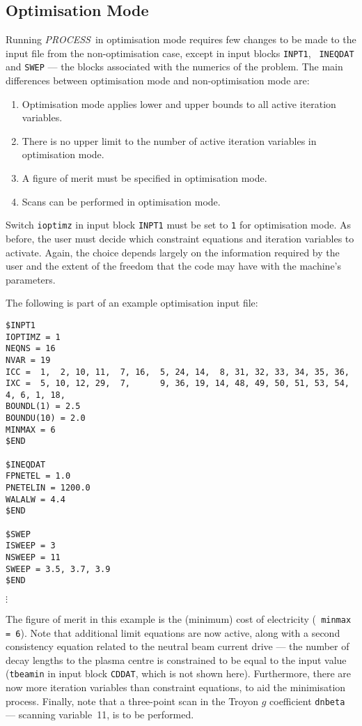 \documentclass[11pt,a4paper]{report}
\newcommand{\PS}{\mbox{\it PROCESS\/ }}
\begin{document}
\subsection{Optimisation Mode}
\label{sec:optim}
Running \PS in optimisation mode requires few changes to be made to the input
file from the non-optimisation case, except in input blocks {\tt INPT1}, {\tt
INEQDAT} and {\tt SWEP} --- the blocks associated with the numerics of the
problem. The main differences between optimisation mode and non-optimisation
mode are:
\begin{enumerate}
\item
Optimisation mode applies lower and upper bounds to all active iteration
variables.
\item
There is no upper limit to the number of active iteration variables in
optimisation mode.
\item
A figure of merit must be specified in optimisation mode.
\item
Scans can be performed in optimisation mode.
\end{enumerate}

Switch {\tt ioptimz} in input block {\tt INPT1} must be set to {\tt 1} for
optimisation mode. As before, the user must decide which constraint equations
and iteration variables to activate. Again, the choice depends largely on the
information required by the user and the extent of the freedom that the code
may have with the machine's parameters.

The following is part of an example optimisation input file:
\begin{verbatim}
$INPT1
IOPTIMZ = 1
NEQNS = 16
NVAR = 19
ICC =  1,  2, 10, 11,  7, 16,  5, 24, 14,  8, 31, 32, 33, 34, 35, 36,
IXC =  5, 10, 12, 29,  7,      9, 36, 19, 14, 48, 49, 50, 51, 53, 54,
4, 6, 1, 18,
BOUNDL(1) = 2.5
BOUNDU(10) = 2.0
MINMAX = 6
$END

$INEQDAT
FPNETEL = 1.0
PNETELIN = 1200.0
WALALW = 4.4
$END

$SWEP
ISWEEP = 3
NSWEEP = 11
SWEEP = 3.5, 3.7, 3.9
$END
\end{verbatim}
\vspace{-8mm}
$\vdots$

The figure of merit in this example is the (minimum) cost of electricity ({\tt
minmax = 6}). Note that additional limit equations are now active, along with
a second consistency equation related to the neutral beam current drive ---
the number of decay lengths to the plasma centre is constrained to be equal to
the input value ({\tt tbeamin} in input block {\tt CDDAT}, which is not shown
here).  Furthermore, there are now more iteration variables than constraint
equations, to aid the minimisation process.  Finally, note that a three-point
scan in the Troyon $g$ coefficient {\tt dnbeta} --- scanning variable~11, is
to be performed.
\end{document}
